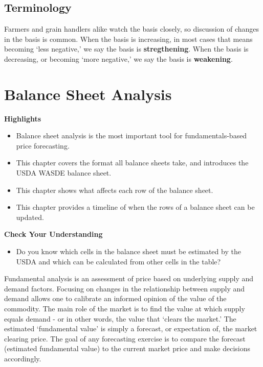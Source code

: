 \documentclass[
]{book}
\providecommand{\tightlist}{%
  \setlength{\itemsep}{0pt}\setlength{\parskip}{0pt}}
\begin{document}
\hypertarget{terminology}{%
\section{Terminology}\label{terminology}}

Farmers and grain handlers alike watch the basis closely, so discussion of changes in the basis is common. When the basis is increasing, in most cases that means becoming `less negative,' we say the basis is \textbf{stregthening}. When the basis is decreasing, or becoming `more negative,' we say the basis is \textbf{weakening}.

\hypertarget{balance-sheet-analysis}{%
\chapter{Balance Sheet Analysis}\label{balance-sheet-analysis}}

\textbf{Highlights}

\begin{itemize}
\tightlist
\item
  Balance sheet analysis is the most important tool for fundamentals-based price forecasting.
\item
  This chapter covers the format all balance sheets take, and introduces the USDA WASDE balance sheet.
\item
  This chapter shows what affects each row of the balance sheet.
\item
  This chapter provides a timeline of when the rows of a balance sheet can be updated.
\end{itemize}

\textbf{Check Your Understanding}

\begin{itemize}
\tightlist
\item
  Do you know which cells in the balance sheet must be estimated by the USDA and which can be calculated from other cells in the table?
\end{itemize}

Fundamental analysis is an assessment of price based on underlying supply and demand factors. Focusing on changes in the relationship between supply and demand allows one to calibrate an informed opinion of the value of the commodity. The main role of the market is to find the value at which supply equals demand - or in other words, the value that `clears the market.' The estimated `fundamental value' is simply a forecast, or expectation of, the market clearing price. The goal of any forecasting exercise is to compare the forecast (estimated fundamental value) to the current market price and make decisions accordingly.
\end{document}
